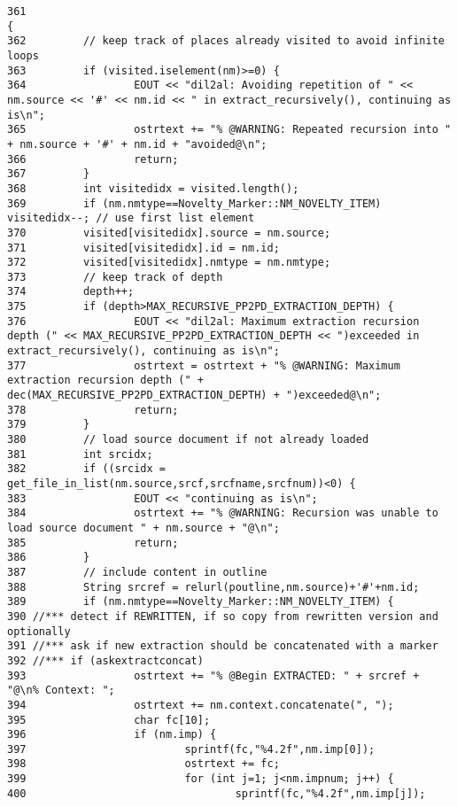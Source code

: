 \footnotesize\begin{verbatim}361                                                                                                                                                                                                            {
362         // keep track of places already visited to avoid infinite loops
363         if (visited.iselement(nm)>=0) {
364                 EOUT << "dil2al: Avoiding repetition of " << nm.source << '#' << nm.id << " in extract_recursively(), continuing as is\n";
365                 ostrtext += "% @WARNING: Repeated recursion into " + nm.source + '#' + nm.id + "avoided@\n";
366                 return;
367         }
368         int visitedidx = visited.length();
369         if (nm.nmtype==Novelty_Marker::NM_NOVELTY_ITEM) visitedidx--; // use first list element
370         visited[visitedidx].source = nm.source;
371         visited[visitedidx].id = nm.id;
372         visited[visitedidx].nmtype = nm.nmtype;
373         // keep track of depth
374         depth++;
375         if (depth>MAX_RECURSIVE_PP2PD_EXTRACTION_DEPTH) {
376                 EOUT << "dil2al: Maximum extraction recursion depth (" << MAX_RECURSIVE_PP2PD_EXTRACTION_DEPTH << ")exceeded in extract_recursively(), continuing as is\n";
377                 ostrtext = ostrtext + "% @WARNING: Maximum extraction recursion depth (" + dec(MAX_RECURSIVE_PP2PD_EXTRACTION_DEPTH) + ")exceeded@\n";
378                 return;
379         }
380         // load source document if not already loaded
381         int srcidx;
382         if ((srcidx = get_file_in_list(nm.source,srcf,srcfname,srcfnum))<0) {
383                 EOUT << "continuing as is\n";
384                 ostrtext += "% @WARNING: Recursion was unable to load source document " + nm.source + "@\n";
385                 return;
386         }
387         // include content in outline
388         String srcref = relurl(poutline,nm.source)+'#'+nm.id;
389         if (nm.nmtype==Novelty_Marker::NM_NOVELTY_ITEM) {
390 //*** detect if REWRITTEN, if so copy from rewritten version and optionally
391 //*** ask if new extraction should be concatenated with a marker
392 //*** if (askextractconcat)
393                 ostrtext += "% @Begin EXTRACTED: " + srcref + "@\n% Context: ";
394                 ostrtext += nm.context.concatenate(", ");
395                 char fc[10];
396                 if (nm.imp) {
397                         sprintf(fc,"%4.2f",nm.imp[0]);
398                         ostrtext += fc;
399                         for (int j=1; j<nm.impnum; j++) {
400                                 sprintf(fc,"%4.2f",nm.imp[j]);

\end{verbatim}
